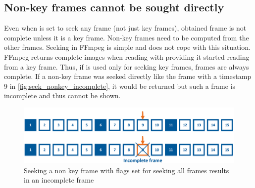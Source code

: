 \subsection{Non-key frames cannot be sought directly}
Even when  is set to seek any frame (not just key frames), obtained frame is not complete unless it is a key frame. Non-key frames need to be computed from the other frames. Seeking in FFmpeg is simple and does not cope with this situation. FFmpeg returns complete images when reading with  providing it started reading from a key frame. Thus, if  is used only for seeking key frames, frames are always complete. If a non-key frame was seeked directly like the frame with a timestamp 9 in \autoref{fig:seek_nonkey_incomplete}, it would be returned but such a frame is incomplete and thus cannot be shown.
\begin{figure}[!htbp]
\includegraphics[width=\textwidth]{fig/seeking_non_key_incomplete}
\caption{Seeking a non key frame with flags set for seeking all frames results in an incomplete frame}
\label{fig:seek_nonkey_incomplete}
\end{figure}

